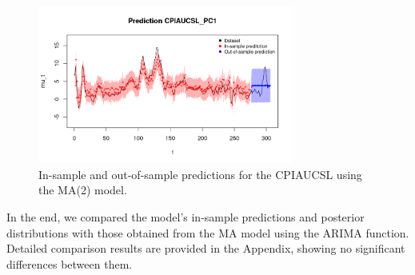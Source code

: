 \begin{figure}[H]
    \centering
    \includegraphics[width=0.75\textwidth]{images/3-MA/infl_prediction2.png}
    \caption{In-sample and out-of-sample predictions for the CPIAUCSL using the MA(2) model.}
    \label{fig:MA2_infl_prediction}
\end{figure}
In the end, we compared the model's in-sample predictions and posterior distributions with those obtained from the MA model using the ARIMA function. Detailed comparison results are provided in the Appendix, showing no significant differences between them.